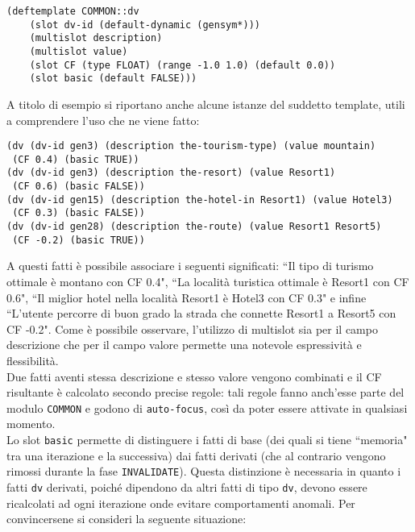 \lstset{numbers=left,breaklines=true,language=C,basicstyle=\small\ttfamily}
\begin{lstlisting}[frame=single]
(deftemplate COMMON::dv 
    (slot dv-id (default-dynamic (gensym*)))
    (multislot description)
    (multislot value)
    (slot CF (type FLOAT) (range -1.0 1.0) (default 0.0))
    (slot basic (default FALSE)))   
\end{lstlisting}

A titolo di esempio si riportano anche alcune istanze del suddetto template, utili a comprendere l'uso che ne viene fatto: 

\begin{lstlisting}[frame=single]
(dv (dv-id gen3) (description the-tourism-type) (value mountain)
 (CF 0.4) (basic TRUE))
(dv (dv-id gen3) (description the-resort) (value Resort1)
 (CF 0.6) (basic FALSE))
(dv (dv-id gen15) (description the-hotel-in Resort1) (value Hotel3)
 (CF 0.3) (basic FALSE))
(dv (dv-id gen28) (description the-route) (value Resort1 Resort5) 
 (CF -0.2) (basic TRUE))
\end{lstlisting}

A questi fatti è possibile associare i seguenti significati: ``Il tipo di turismo ottimale è montano con CF 0.4", ``La località turistica ottimale è Resort1 con CF 0.6", ``Il miglior hotel nella località Resort1 è Hotel3 con CF 0.3" e infine ``L'utente percorre di buon grado la strada che connette Resort1 a Resort5 con CF -0.2". Come è possibile osservare, l'utilizzo di multislot sia per il campo descrizione che per il campo valore permette una notevole espressività e flessibilità.\\
Due fatti aventi stessa descrizione e stesso valore vengono combinati e il CF risultante è calcolato secondo precise regole: tali regole fanno anch'esse parte del modulo \texttt{COMMON} e godono di \texttt{auto-focus}, così da poter essere attivate in qualsiasi momento.\\
Lo slot \texttt{basic} permette di distinguere i fatti di base (dei quali si tiene ``memoria" tra una iterazione e la successiva) dai fatti derivati (che al contrario vengono rimossi durante la fase \texttt{INVALIDATE}). Questa distinzione è necessaria in quanto i fatti \texttt{dv} derivati, poiché dipendono da altri fatti di tipo \texttt{dv}, devono essere ricalcolati ad ogni iterazione onde evitare comportamenti anomali. Per convincersene si consideri la seguente situazione:

